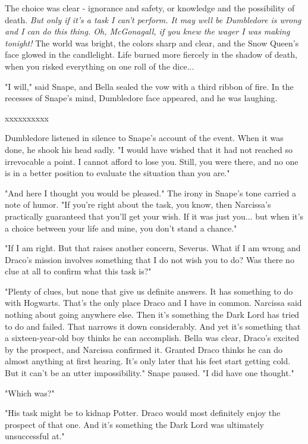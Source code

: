 \documentclass[a4paper,11pt]{article}
\begin{document}
The choice was clear - ignorance and safety, or knowledge and the possibility of death. \emph{But only if it's a task I can't perform. It may well be Dumbledore is wrong and I can do this thing. Oh, McGonagall, if you knew the wager I was making tonight!} The world was bright, the colors sharp and clear, and the Snow Queen's face glowed in the candlelight. Life burned more fiercely in the shadow of death, when you risked everything on one roll of the dice...

"I will," said Snape, and Bella sealed the vow with a third ribbon of fire. In the recesses of Snape's mind, Dumbledore face appeared, and he was laughing.

xxxxxxxxxx

Dumbledore listened in silence to Snape's account of the event. When it was done, he shook his head sadly. "I would have wished that it had not reached so irrevocable a point. I cannot afford to lose you. Still, you were there, and no one is in a better position to evaluate the situation than you are."

"And here I thought you would be pleased." The irony in Snape's tone carried a note of humor. "If you're right about the task, you know, then Narcissa's practically guaranteed that you'll get your wish. If it was just you... but when it's a choice between your life and mine, you don't stand a chance."

"If I am right. But that raises another concern, Severus. What if I am wrong and Draco's mission involves something that I do not wish you to do? Was there no clue at all to confirm what this task is?"

"Plenty of clues, but none that give us definite answers. It has something to do with Hogwarts. That's the only place Draco and I have in common. Narcissa said nothing about going anywhere else. Then it's something the Dark Lord has tried to do and failed. That narrows it down considerably. And yet it's something that a sixteen-year-old boy thinks he can accomplish. Bella was clear, Draco's excited by the prospect, and Narcissa confirmed it. Granted Draco thinks he can do almost anything at first hearing. It's only later that his feet start getting cold. But it can't be an utter impossibility." Snape paused. "I did have one thought."

"Which was?"

"His task might be to kidnap Potter. Draco would most definitely enjoy the prospect of that one. And it's something the Dark Lord was ultimately unsuccessful at."
\end{document}

